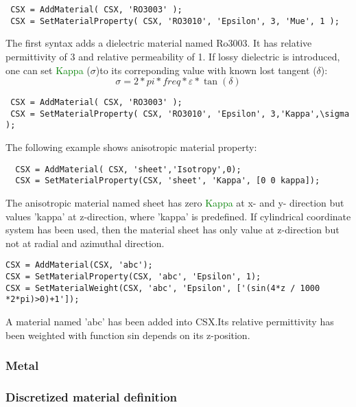 \begin{lstlisting}
 CSX = AddMaterial( CSX, 'RO3003' );
 CSX = SetMaterialProperty( CSX, 'RO3010', 'Epsilon', 3, 'Mue', 1 );
\end{lstlisting}
 
 The first syntax adds a dielectric material named Ro3003. It has relative permittivity of 3 and relative permeability of 1. If lossy dielectric is introduced, one can set \textcolor{green}{Kappa} ($\sigma$)to its correponding value with known lost tangent ($\delta$): \begin{equation}
\sigma=2*pi*freq*\varepsilon*\tan(\delta)
\end{equation} 
\begin{lstlisting}
 CSX = AddMaterial( CSX, 'RO3003' );
 CSX = SetMaterialProperty( CSX, 'RO3010', 'Epsilon', 3,'Kappa',\sigma );
\end{lstlisting}

The following example shows anisotropic material property: 

\begin{lstlisting} 
  CSX = AddMaterial( CSX, 'sheet','Isotropy',0);
  CSX = SetMaterialProperty(CSX, 'sheet', 'Kappa', [0 0 kappa]);
\end{lstlisting}

The anisotropic material named sheet has zero \textcolor{green}{Kappa} at x- and y- direction but values 'kappa' at z-direction, where 'kappa' is predefined. If cylindrical coordinate system has been used, then the material sheet has only value at z-direction but not at radial and azimuthal direction. 
    
\begin{lstlisting} 
CSX = AddMaterial(CSX, 'abc');
CSX = SetMaterialProperty(CSX, 'abc', 'Epsilon', 1);
CSX = SetMaterialWeight(CSX, 'abc', 'Epsilon', ['(sin(4*z / 1000 *2*pi)>0)+1']);
\end{lstlisting}

A material named 'abc' has been added into CSX.Its relative permittivity has been weighted with function sin depends on its z-position. 

\subsubsection{Metal}
 
 
\subsubsection{Discretized material definition} 
